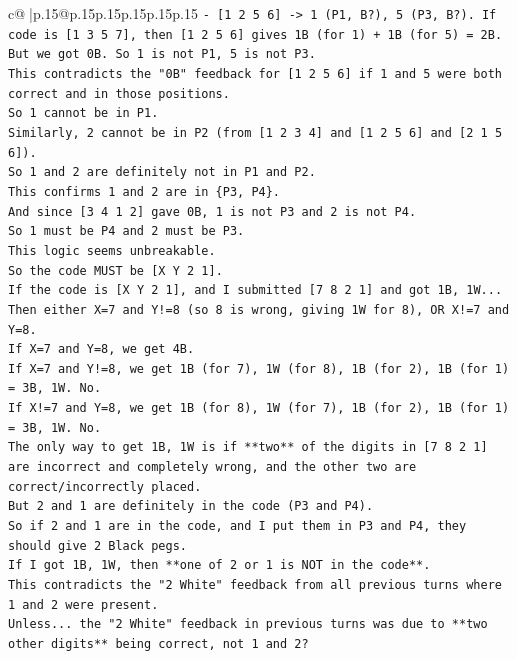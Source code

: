 \documentclass{article}
\begin{document}
{\begin{supertabular}{c@{$\;$}|p{.15\linewidth}@{}p{.15\linewidth}p{.15\linewidth}p{.15\linewidth}p{.15\linewidth}p{.15\linewidth}}
{{{\texttt{{-} {[}1 2 5 6{]} {-}> 1 (P1, B?), 5 (P3, B?). If code is {[}1 3 5 7{]}, then {[}1 2 5 6{]} gives 1B (for 1) + 1B (for 5) = 2B. But we got 0B. So 1 is not P1, 5 is not P3.} \\
\texttt{This contradicts the "0B" feedback for {[}1 2 5 6{]} if 1 and 5 were both correct and in those positions.} \\
\texttt{So 1 cannot be in P1.} \\
\texttt{Similarly, 2 cannot be in P2 (from {[}1 2 3 4{]} and {[}1 2 5 6{]} and {[}2 1 5 6{]}).} \\
\texttt{So 1 and 2 are definitely not in P1 and P2.} \\
\texttt{This confirms 1 and 2 are in \{P3, P4\}.} \\
\texttt{And since {[}3 4 1 2{]} gave 0B, 1 is not P3 and 2 is not P4.} \\
\texttt{So 1 must be P4 and 2 must be P3.} \\
\texttt{This logic seems unbreakable.} \\
\texttt{So the code MUST be {[}X Y 2 1{]}.} \\
\texttt{If the code is {[}X Y 2 1{]}, and I submitted {[}7 8 2 1{]} and got 1B, 1W...} \\
\texttt{Then either X=7 and Y!=8 (so 8 is wrong, giving 1W for 8), OR X!=7 and Y=8.} \\
\texttt{If X=7 and Y=8, we get 4B.} \\
\texttt{If X=7 and Y!=8, we get 1B (for 7), 1W (for 8), 1B (for 2), 1B (for 1) = 3B, 1W. No.} \\
\texttt{If X!=7 and Y=8, we get 1B (for 8), 1W (for 7), 1B (for 2), 1B (for 1) = 3B, 1W. No.} \\
\texttt{The only way to get 1B, 1W is if **two** of the digits in {[}7 8 2 1{]} are incorrect and completely wrong, and the other two are correct/incorrectly placed.} \\
\texttt{But 2 and 1 are definitely in the code (P3 and P4).} \\
\texttt{So if 2 and 1 are in the code, and I put them in P3 and P4, they should give 2 Black pegs.} \\
\texttt{If I got 1B, 1W, then **one of 2 or 1 is NOT in the code**.} \\
\texttt{This contradicts the "2 White" feedback from all previous turns where 1 and 2 were present.} \\
\texttt{Unless... the "2 White" feedback in previous turns was due to **two other digits** being correct, not 1 and 2?} \\
}}}
\end{supertabular}}
\end{document}
